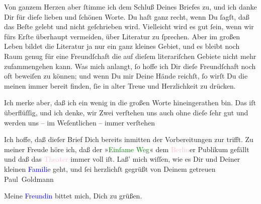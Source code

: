 \pstart
           Von ganzem Herzen  aber ſtimme ich dem Schluß Deines Briefes zu, und ich danke Dir für dieſe
               lieben {\pb}und ſchönen Worte. Du haſt ganz recht, wenn
               Du ſagſt, daß das Beſte gelebt und nicht geſchrieben wird. Vielleicht wird es gut
               ſein, wenn wir fürs Erſte überhaupt vermeiden, über Literatur zu ſprechen. Aber im
               großen Leben bildet die Literatur ja nur ein ganz kleines Gebiet, und es bleibt noch
               Raum genug für eine Freundſchaft die auf dieſem literariſchen Gebiete nicht mehr
               zufammengehen kann. Was mich anlangt, ſo hoffe ich Dir dieſe Freundſchaft noch oft
               beweiſen zu können; und  wenn Du mir Deine Hände
               reichſt, ſo wirſt Du die meinen immer bereit finden, ſie \strikeout{\textcolor{gray}{×}\-\textcolor{gray}{×}\-\textcolor{gray}{×}} in alter Treue und Herzlichkeit zu drücken.\pend
           
\pstart
            Ich merke aber, daß ich ein wenig in die großen Worte hineingerathen bin. Das
               iſt überflüſſig, und ich denke, wir Zwei verſtehen uns {\pb}auch ohne dieſe ſehr gut und werden uns – im Weſentlichen – immer verſtehen{\dotsfour}\pend
           
\pstart
           Ich hoffe, daß dieſer Brief Dich bereits inmitten der Vorbereitungen zur \label{K_L03440-4v}\label{K_L03440-4h} trifft. Zu meiner Freude höre
               ich, daß der »\textcolor{green}{Einſame Weg}{}\ledrightnote{\textcolor{green}{Der einsame Weg. Schauspiel in fünf Akten}}« dem 
               \textcolor{pink}{Berlin}{}\ledrightnote{\textcolor{pink}{Berlin}}er Publikum gefällt und daß das \textcolor{pink}{Theater}{}\ledrightnote{{$\rightarrow$}\textcolor{pink}{Deutsches Theater Berlin}} immer voll iſt. Laß’ mich wiſſen, wie
               es Dir und Deiner kleinen \textcolor{blue}{Familie}{}\ledrightnote{{$\rightarrow$}\textcolor{blue}{Olga Schnitzler}{\newline}{$\rightarrow$}\textcolor{blue}{Heinrich Schnitzler}} geht, und ſei herzlichſt gegrüßt von Deinem
               getreuen \spacefill\mbox{Paul Goldmann}\pend
           
\pstart
           \noindent{}Meine \textcolor{blue}{Freundin}{}\ledrightnote{{$\rightarrow$}\textcolor{blue}{Theodore Rottenberg}} bittet
                  mich, Dich zu grüßen.\pend
           \endnumbering{}
\begin{anhang}
\end{anhang}
      